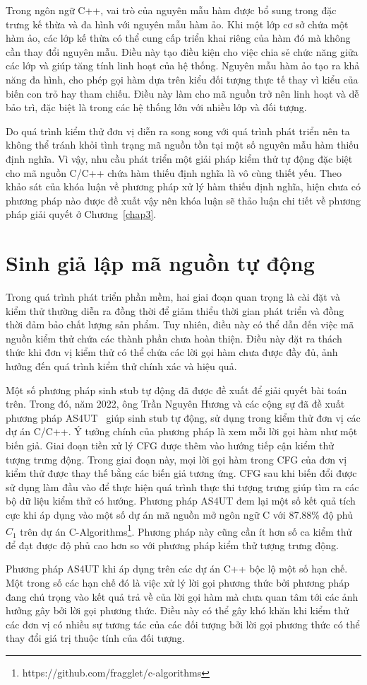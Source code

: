 Trong ngôn ngữ C++, vai trò của nguyên mẫu hàm được bổ sung trong đặc trưng kế thừa và đa hình với nguyên mẫu hàm ảo. Khi một lớp cơ sở chứa một hàm ảo, các lớp kế thừa có thể cung cấp triển khai riêng của hàm đó mà không cần thay đổi nguyên mẫu. Điều này tạo điều kiện cho việc chia sẻ chức năng giữa các lớp và giúp tăng tính linh hoạt của hệ thống. Nguyên mẫu hàm ảo tạo ra khả năng đa hình, cho phép gọi hàm dựa trên kiểu đối tượng thực tế thay vì kiểu của biến con trỏ hay tham chiếu. Điều này làm cho mã nguồn trở nên linh hoạt và dễ bảo trì, đặc biệt là trong các hệ thống lớn với nhiều lớp và đối tượng.

Do quá trình kiểm thử đơn vị diễn ra song song với quá trình phát triển nên ta không thể tránh khỏi tình trạng mã nguồn tồn tại một số nguyên mẫu hàm thiếu định nghĩa. Vì vậy, nhu cầu phát triển một giải pháp kiểm thử tự động đặc biệt cho mã nguồn C/C++ chứa hàm thiếu định nghĩa là vô cùng thiết yếu. Theo khảo sát của khóa luận về phương pháp xử lý hàm thiếu định nghĩa, hiện chưa có phương pháp nào được đề xuất vậy nên khóa luận sẽ thảo luận chi tiết về phương pháp giải quyết ở Chương~\ref{chap3}.

\section{Sinh giả lập mã nguồn tự động} \label{sec:autostub-Lam}
Trong quá trình phát triển phần mềm, hai giai đoạn quan trọng là cài đặt và kiểm thử thường diễn ra đồng thời để giảm thiểu thời gian phát triển và đồng thời đảm bảo chất lượng sản phẩm. Tuy nhiên, điều này có thể dẫn đến việc mã nguồn kiểm thử chứa các thành phần chưa hoàn thiện. Điều này đặt ra thách thức khi đơn vị kiểm thử có thể chứa các lời gọi hàm chưa được đầy đủ, ảnh hưởng đến quá trình kiểm thử chính xác và hiệu quả.

Một số phương pháp sinh stub tự động đã được đề xuất để giải quyết bài toán trên. Trong đó, năm 2022, ông Trần Nguyên Hương và các cộng sự đã đề xuất phương pháp AS4UT~\cite{TUNG2022106821} giúp sinh stub tự động, sử dụng trong kiểm thử đơn vị các dự án C/C++. Ý tưởng chính của phương pháp là xem mỗi lời gọi hàm như một biến giả. Giai đoạn tiền xử lý CFG được thêm vào hướng tiếp cận kiểm thử tượng trưng động. Trong giai đoạn này, mọi lời gọi hàm trong CFG của đơn vị kiểm thử được thay thế bằng các biến giả tương ứng. CFG sau khi biến đổi được sử dụng làm đầu vào để thực hiện quá trình thực thi tượng trưng giúp tìm ra các bộ dữ liệu kiểm thử có hướng. Phương pháp AS4UT đem lại một số kết quả tích cực khi áp dụng vào một số dự án mã nguồn mở ngôn ngữ C với 87.88\% độ phủ $C_1$ trên dự án C-Algorithms\footnote{https://github.com/fragglet/c-algorithms}. Phương pháp này cũng cần ít hơn số ca kiểm thử để đạt được độ phủ cao hơn so với phương pháp kiểm thử tượng trưng động.

Phương pháp AS4UT khi áp dụng trên các dự án C++ bộc lộ một số hạn chế. Một trong số các hạn chế đó là việc xử lý lời gọi phương thức bởi phương pháp đang chú trọng vào kết quả trả về của lời gọi hàm mà chưa quan tâm tới các ảnh hưởng gây bởi lời gọi phương thức. Điều này có thể gây khó khăn khi kiểm thử các đơn vị có nhiều sự tương tác của các đối tượng bởi lời gọi phương thức có thể thay đổi giá trị thuộc tính của đối tượng.